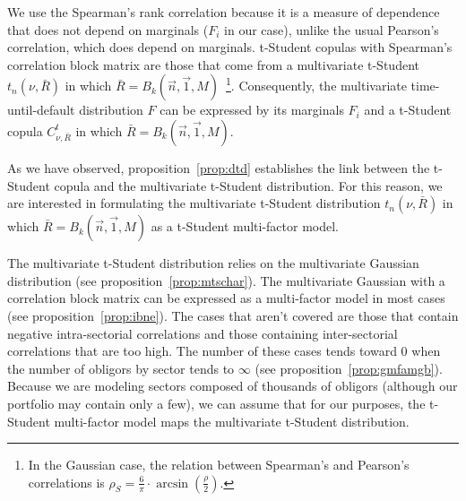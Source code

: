\documentclass[11pt,fleqn]{book} %
\begin{document}
We use the Spearman's rank correlation because it is a measure of dependence 
that does not depend on marginals ($F_i$ in our case), unlike the usual
Pearson's correlation, which does depend on marginals. t-Student copulas 
with Spearman's correlation block matrix are those that come from a 
multivariate t-Student $t_n(\nu,\bar{R})$ in which 
$\bar{R} = B_k(\vec{n},\vec{1},M)$~\footnote{ In the Gaussian case, the 
relation between Spearman's and Pearson's correlations is 
$\rho_S = \frac{6}{\pi}\cdot \arcsin(\frac{\rho}{2})$.}.
Consequently, the multivariate time-until-default distribution $F$ can be 
expressed by its marginals $F_i$ and a t-Student copula $C_{\nu,\bar{R}}^t$
in which $\bar{R} = B_k(\vec{n},\vec{1},M)$.

As we have observed, proposition~\ref{prop:dtd} establishes the link between 
the t-Student copula and the multivariate t-Student distribution. For this 
reason, we are interested in formulating the multivariate t-Student distribution 
$t_n(\nu,\bar{R})$ in which $\bar{R} = B_k(\vec{n},\vec{1},M)$ as a t-Student
multi-factor model.

The multivariate t-Student distribution relies on the multivariate Gaussian
distribution (see proposition~\ref{prop:mtschar}). The multivariate Gaussian 
with a correlation block matrix can be expressed as a multi-factor model in 
most cases (see proposition~\ref{prop:ibne}). The cases that aren't covered 
are those that contain negative intra-sectorial correlations and those 
containing inter-sectorial correlations that are too high. The number of these 
cases tends toward $0$ when the number of obligors by sector tends to $\infty$ 
(see proposition~\ref{prop:gmfamgb}). Because we are modeling sectors composed 
of thousands of obligors (although our portfolio may contain only a few), we 
can assume that for our purposes, the t-Student multi-factor model maps the 
multivariate t-Student distribution.
\end{document}
